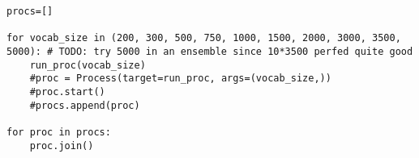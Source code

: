 \begin{verbatim}
procs=[]

for vocab_size in (200, 300, 500, 750, 1000, 1500, 2000, 3000, 3500, 5000): # TODO: try 5000 in an ensemble since 10*3500 perfed quite good
    run_proc(vocab_size)
    #proc = Process(target=run_proc, args=(vocab_size,))
    #proc.start()
    #procs.append(proc)

for proc in procs:
    proc.join()


\end{verbatim}